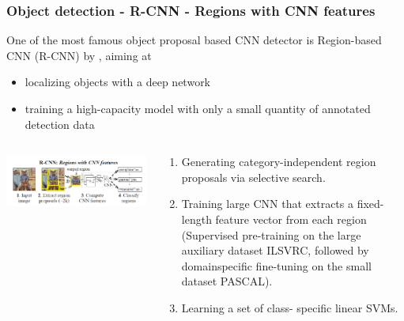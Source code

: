 \begin{frame}[allowframebreaks]
	\frametitle{Object detection - R-CNN - Regions with CNN features}
	
	
	
	One of the most famous object proposal based CNN detector is Region-based CNN (R-CNN) by \cite{girshick2014rich}, aiming at 
	\begin{itemize}
		\item localizing objects with  a  deep  network
		\item training  a  high-capacity  model with only a small quantity of annotated detection data
	\end{itemize} 


	
\begin{columns} %
	
	\begin{column}{.5\textwidth}
		\begin{center}
		\includegraphics[scale=0.6]{figs/RCNN_structure}
	\end{center}
	\end{column}%
	
	
	
	\begin{column}{.4\textwidth}
	\begin{enumerate}
		\item Generating category-independent region proposals via selective search.
		
		\item Training large CNN that extracts a fixed-length feature vector from each region (Supervised pre-training  on the large auxiliary dataset ILSVRC, followed by domainspecific   fine-tuning on the small dataset PASCAL).
		\item Learning a set of class-
		specific linear SVMs. 
	\end{enumerate}
	\end{column}%
\end{columns}


\end{frame}
